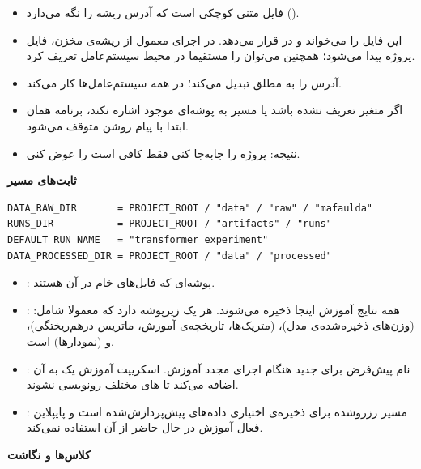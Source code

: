 \documentclass{article}
\newcommand{\mysubsection}[1]{
\par\vspace{0.5cm}
\noindent\textcolor{main_blue}{\large\textbf{#1}}
\par\vspace{0.2cm}
}
\begin{document}
\begin{itemize}
\item {} فایل متنی کوچکی است که آدرس ریشه را نگه می‌دارد
().
\item {} این فایل را می‌خواند و در  قرار می‌دهد.
در اجرای معمول از ریشه‌ی مخزن، فایل  پروژه پیدا می‌شود؛ همچنین می‌توان
 را مستقیما در محیط سیستم‌عامل تعریف کرد.
\item {} آدرس را به مطلق تبدیل می‌کند؛ در همه سیستم‌عامل‌ها کار می‌کند.
\item اگر متغیر تعریف نشده باشد یا مسیر به پوشه‌ای موجود اشاره نکند، برنامه همان ابتدا
با پیام روشن متوقف می‌شود.
\item نتیجه: پروژه را جابه‌جا کنی فقط کافی است  را عوض کنی.
\end{itemize}

\mysubsection{ثابت‌های مسیر}

\begin{latin}
\begin{lstlisting}
DATA_RAW_DIR       = PROJECT_ROOT / "data" / "raw" / "mafaulda"
RUNS_DIR           = PROJECT_ROOT / "artifacts" / "runs"
DEFAULT_RUN_NAME   = "transformer_experiment"
DATA_PROCESSED_DIR = PROJECT_ROOT / "data" / "processed"
\end{lstlisting}
\end{latin}

\begin{itemize}
\item {}: پوشه‌ای که فایل‌های  خام  در آن هستند.
\item {}: همه نتایج آموزش اینجا ذخیره می‌شوند. هر  یک زیرپوشه دارد که معمولا شامل:
 (وزن‌های ذخیره‌شده‌ی مدل)،
 (متریک‌ها، تاریخچه‌ی آموزش، ماتریس درهم‌ریختگی)، و
 (نمودارها) است.

\item {}: نام پیش‌فرض برای  جدید هنگام اجرای مجدد آموزش.
اسکریپت آموزش یک  به آن اضافه می‌کند تا های مختلف رونویسی نشوند.

\item {}: مسیر رزروشده برای ذخیره‌ی اختیاری داده‌های
پیش‌پردازش‌شده است و پایپلاین فعال آموزش در حال حاضر از آن استفاده نمی‌کند.
\end{itemize}

\mysubsection{کلاس‌ها و نگاشت}
\end{document}
